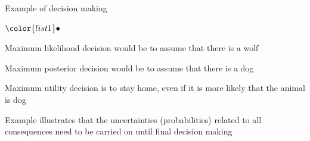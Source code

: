 \documentclass[t]{beamer}
\newenvironment{list1}{
   \begin{list}{$\color{list1}\bullet$}{\itemsep=6pt}}{
  \end{list}}
\newenvironment{list2}{
  \begin{list}{-}{\baselineskip=12pt\itemsep=2pt}}{
  \end{list}}
\begin{document}
\begin{frame}
  
  {\Large\color{navyblue} Example of decision making}

  \begin{list1}
  \item<+-> Maximum likelihood decision would be to assume that there is a wolf
  \item<+-> Maximum posterior decision would be to assume that there is a dog
  \item<+-> Maximum utility decision is to stay home, even if it is more likely that the animal is dog
  \item<+-> Example illustrates that the uncertainties (probabilities)
    related to all consequences need to be carried on until final
    decision making
  \end{list1}

\end{frame}





\end{document}
